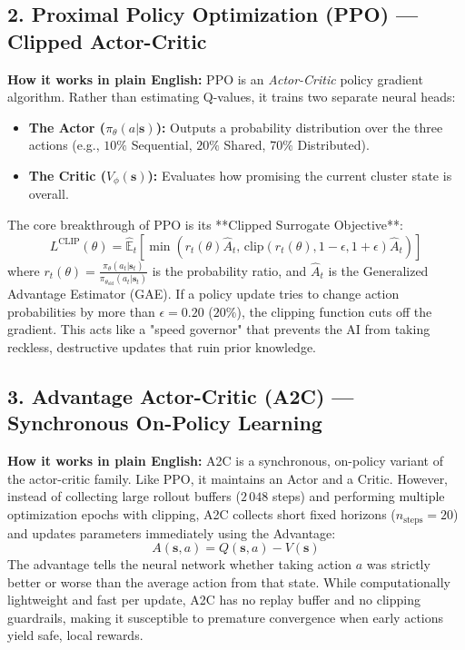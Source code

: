 \documentclass[11pt,a4paper]{article}
\begin{document}
\subsection{2. Proximal Policy Optimization (PPO) --- Clipped Actor-Critic}
\textbf{How it works in plain English:}
PPO is an \textit{Actor-Critic} policy gradient algorithm. Rather than estimating Q-values, it trains two separate neural heads:
\begin{itemize}[noitemsep, topsep=1pt]
    \item \textbf{The Actor ($\pi_\theta(a \vert \mathbf{s})$):} Outputs a probability distribution over the three actions (e.g., $10\%$ Sequential, $20\%$ Shared, $70\%$ Distributed).
    \item \textbf{The Critic ($V_\phi(\mathbf{s})$):} Evaluates how promising the current cluster state is overall.
\end{itemize}
The core breakthrough of PPO is its **Clipped Surrogate Objective**:
\begin{equation*}
    L^{\text{CLIP}}(\theta) = \hat{\mathbb{E}}_t \left[ \min\left( r_t(\theta) \hat{A}_t, \, \text{clip}(r_t(\theta), 1-\epsilon, 1+\epsilon) \hat{A}_t \right) \right]
\end{equation*}
where $r_t(\theta) = \frac{\pi_\theta(a_t \vert \mathbf{s}_t)}{\pi_{\theta_{\text{old}}}(a_t \vert \mathbf{s}_t)}$ is the probability ratio, and $\hat{A}_t$ is the Generalized Advantage Estimator (GAE). If a policy update tries to change action probabilities by more than $\epsilon = 0.20$ ($20\%$), the clipping function cuts off the gradient. This acts like a "speed governor" that prevents the AI from taking reckless, destructive updates that ruin prior knowledge.

\subsection{3. Advantage Actor-Critic (A2C) --- Synchronous On-Policy Learning}
\textbf{How it works in plain English:}
A2C is a synchronous, on-policy variant of the actor-critic family. Like PPO, it maintains an Actor and a Critic. However, instead of collecting large rollout buffers ($2\,048$ steps) and performing multiple optimization epochs with clipping, A2C collects short fixed horizons ($n_{\text{steps}} = 20$) and updates parameters immediately using the Advantage:
\begin{equation*}
    A(\mathbf{s}, a) = Q(\mathbf{s}, a) - V(\mathbf{s})
\end{equation*}
The advantage tells the neural network whether taking action $a$ was strictly better or worse than the average action from that state. While computationally lightweight and fast per update, A2C has no replay buffer and no clipping guardrails, making it susceptible to premature convergence when early actions yield safe, local rewards.
\end{document}
